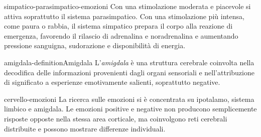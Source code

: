 \documentclass[preview]{standalone}
\begin{document}
\begin{snippet}{simpatico-parasimpatico-emozioni}
    Con una stimolazione moderata e piacevole si attiva soprattutto il sistema
    parasimpatico. Con una stimolazione più intensa, come paura o rabbia, il
    sistema simpatico prepara il corpo alla reazione di emergenza, favorendo il
    rilascio di adrenalina e noradrenalina e aumentando pressione sanguigna,
    sudorazione e disponibilità di energia.
\end{snippet}

\begin{snippetdefinition}{amigdala-definition}{Amigdala}
    L'\emph{amigdala} è una struttura cerebrale coinvolta nella decodifica delle
    informazioni provenienti dagli organi sensoriali e nell'attribuzione di
    significato a esperienze emotivamente salienti, soprattutto negative.
\end{snippetdefinition}

\begin{snippet}{cervello-emozioni}
    La ricerca sulle emozioni si è concentrata su ipotalamo, sistema limbico e
    amigdala. Le emozioni positive e negative non producono semplicemente
    risposte opposte nella stessa area corticale, ma coinvolgono reti cerebrali
    distribuite e possono mostrare differenze individuali.
\end{snippet}
\end{document}

